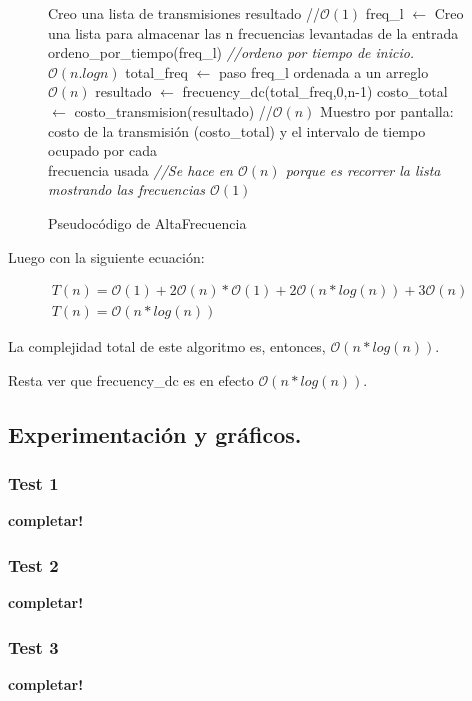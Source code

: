\begin{figure}[!ht]
\begin{codebox}
\li Creo una lista de transmisiones resultado  //$\mathcal{O}(1)$ 
\li freq_l $\leftarrow$ Creo una lista para almacenar las n frecuencias levantadas de la entrada
\li ordeno_por_tiempo(freq_l) {\it //ordeno por tiempo de inicio. $\mathcal{O}(n.logn)$}
\li total_freq $\leftarrow$ paso freq_l ordenada a un arreglo $\mathcal{O}(n)$
\li resultado $\leftarrow$ frecuency_dc(total_freq,0,n-1)
\li costo_total $\leftarrow$ costo_transmision(resultado) //$\mathcal{O}(n)$
\li Muestro por pantalla: costo de la transmisión (costo_total) y el intervalo de tiempo ocupado por cada\\ frecuencia usada {\it //Se hace en $\mathcal{O}(n)$ porque es recorrer la lista mostrando las frecuencias $\mathcal{O}(1)$}
\end{codebox}
\caption{Pseudocódigo de AltaFrecuencia}\label{code:altafrec}
\end{figure}
\FloatBarrier

Luego con la siguiente ecuación:

\begin{equation*}
\begin{array}{l}
T(n) = \mathcal{O}(1) + 2\mathcal{O}(n)*\mathcal{O}(1) + 2\mathcal{O}(n*log(n)) + 3\mathcal{O}(n)\\
T(n) = \mathcal{O}(n*log(n))
\end{array}
\end{equation*}

La complejidad total de este algoritmo es, entonces, $\mathcal{O}(n*log(n))$.

Resta ver que frecuency_dc es en efecto $\mathcal{O}(n*log(n))$.


\vspace*{0.6cm}

\subsection{Experimentación y gráficos.}

\vspace*{0.3cm}

\subsubsection{Test 1}

\vspace*{0.3cm}

\textbf{completar!}


\newpage
\subsubsection{Test 2}

\vspace*{0.3cm}

\textbf{completar!}


\newpage
\subsubsection{Test 3}

\vspace*{0.3cm}

\textbf{completar!}
